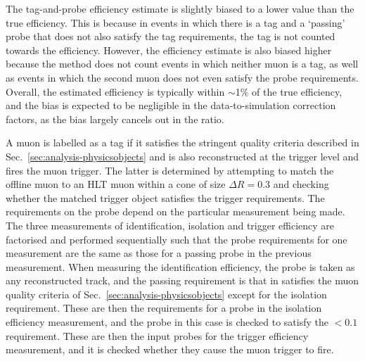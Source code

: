 The tag-and-probe efficiency estimate is slightly biased to a lower value than 
the true efficiency. This is because in events in which there is a tag and a 
`passing' probe that does not also satisfy the tag requirements, the tag is not 
counted towards the efficiency. However, the efficiency estimate is also biased 
higher because the method does not count events in which neither muon is a tag, 
as well as events in which the second muon does not even satisfy the probe 
requirements. Overall, the estimated efficiency is typically within $\sim$1\% 
of the true efficiency, and the bias is expected to be negligible in the 
data-to-simulation correction factors, as the bias largely cancels out in the 
ratio.

A muon is labelled as a tag if it satisfies the stringent quality criteria 
described in Sec.~\ref{sec:analysis-physicsobjects} and is also reconstructed 
at the trigger level and fires the muon trigger. The latter is determined by 
attempting to match the 
offline muon to an HLT muon within a cone of size $\Delta R=0.3$ and checking 
whether the matched trigger object satisfies the trigger requirements.
The requirements on the probe depend on the particular measurement being made. 
The three measurements of identification, isolation and trigger efficiency are 
factorised and performed sequentially such that the probe requirements for one 
measurement are the same as those for a passing probe in the previous 
measurement. When measuring the identification efficiency, the probe is taken 
as any reconstructed track, and the passing requirement is that in satisfies 
the muon quality criteria of Sec.~\ref{sec:analysis-physicsobjects} except for 
the 
isolation requirement. These are then the requirements for a probe in the 
isolation efficiency measurement, and the probe in this case is checked to 
satisfy the {\reliso$<0.1$} requirement. These are then the input probes for 
the trigger efficiency measurement, and it is checked whether they cause the 
muon trigger to fire.

